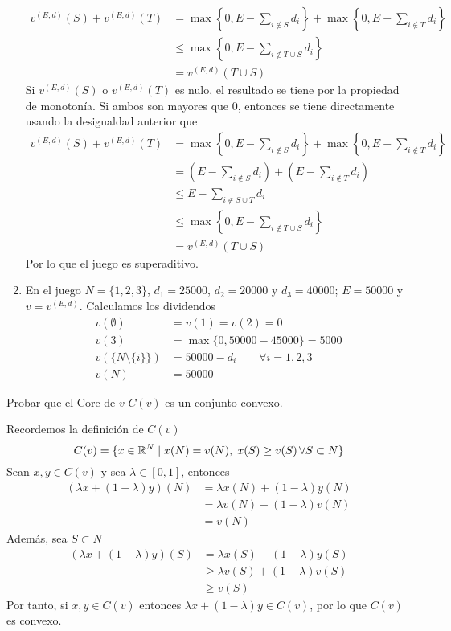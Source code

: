 \documentclass[twoside]{article}
\begin{document}
\begin{solucion}
\begin{enumerate}
\begin{align*}
v^{(E,d)}(S) + v^{(E,d)}(T) &=\max\left\{0,E-\sum_{i\notin S} d_i\right\} + \max\left\{0,E-\sum_{i\notin T} d_i\right\} \\
&\leq \max\left\{0,E-\sum_{i\notin T\cup S} d_i\right\} \\
&= v^{(E,d)}(T\cup S)
\end{align*}
Si $v^{(E,d)}(S)$ o $v^{(E,d)}(T)$ es nulo, el resultado se tiene por la propiedad de monotonía. Si ambos son mayores que $0$, entonces se tiene directamente usando la desigualdad anterior que
\begin{align*}
v^{(E,d)}(S) + v^{(E,d)}(T) &=\max\left\{0,E-\sum_{i\notin S} d_i\right\} + \max\left\{0,E-\sum_{i\notin T} d_i\right\} \\
& = \left(E-\sum_{i\notin S} d_i\right) + \left(E-\sum_{i\notin T} d_i\right)\\
&\leq E - \sum_{i \notin S\cup T} d_i \\
&\leq \max\left\{0,E-\sum_{i\notin T\cup S} d_i\right\} \\
&= v^{(E,d)}(T\cup S)
\end{align*}
Por lo que el juego es superaditivo.
\item En el juego $N=\{1,2,3\}$, $d_1 = 25000$, $d_2 = 20000$ y $d_3 = 40000$; $E=50000$ y $v=v^{(E,d)}$. Calculamos los dividendos
\begin{align*}
v(\emptyset) &= v(1)=v(2) =0\\
v(3) &=  \max\{0,50000-45000\} = 5000\\
v(\{N\setminus \{i\}\})& = 50000- d_i  \qquad \forall i = 1,2,3\\
v(N) &= 50000
\end{align*}
\end{enumerate}
\end{solucion}
\newpage

\begin{ejercicio}{3}
Probar que el Core de $v$ $C(v)$ es un conjunto convexo.
\end{ejercicio}
\begin{solucion}
Recordemos la definición de $C(v)$
$$
C(v)=\{x\in \mathbb{R}^N\mid x(N)=v(N),\; x(S)\geq v(S) \,\forall S\subset N\}
$$
Sean $x,y \in C(v)$ y sea $\lambda \in [0,1]$, entonces
\begin{align*}
(\lambda x + (1-\lambda)y)(N) &= \lambda x (N) + (1-\lambda)y(N)\\
&= \lambda v(N) + (1-\lambda) v(N) \\
&= v(N)
\end{align*}
Además, sea $S\subset N$
\begin{align*}
(\lambda x + (1-\lambda)y)(S) & = \lambda x (S) + (1-\lambda)y(S)\\
&\geq  \lambda v(S) + (1-\lambda) v(S) \\
&\geq v(S)
\end{align*}
Por tanto, si $x,y\in C(v)$ entonces $\lambda x + (1-\lambda) y \in C(v)$, por lo que $C(v)$ es convexo.
\end{solucion}
\end{document}
